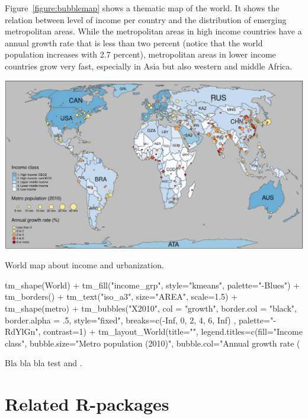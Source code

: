 Figure~\ref{figure:bubblemap} shows a thematic map of the world. It shows the relation between level of income per country and the distribution of emerging metropolitan areas. While the metropolitan areas in high income countries have a annual growth rate that is less than two percent (notice that the world population increases with 2.7 percent), metropolitan areas in lower income countries grow very fast, especially in Asia but also western and middle Africa.

\begin{widefigure}[htbp]
  \centering
  \includegraphics{bubbleMap2}
  \caption{World map about income and urbanization.}
  \label{figure:bubblemap}
\end{widefigure}






\begin{example}
tm_shape(World) +
  tm_fill("income_grp", style="kmeans", palette="-Blues") +
  tm_borders() +
  tm_text("iso_a3", size="AREA", scale=1.5) +
tm_shape(metro) +
  tm_bubbles("X2010", col = "growth", border.col = "black", 
  border.alpha = .5, style="fixed", breaks=c(-Inf, 0, 2, 4, 6, Inf) ,
  palette="-RdYlGn", contrast=1) + 
tm_layout_World(title="", legend.titles=c(fill="Income class", 
  bubble.size="Metro population (2010)", bubble.col="Annual growth rate (%
\end{example}


Bla bla bla test \citet{tmap} and \citep{sp2}. 

\section{Related R-packages}


%

